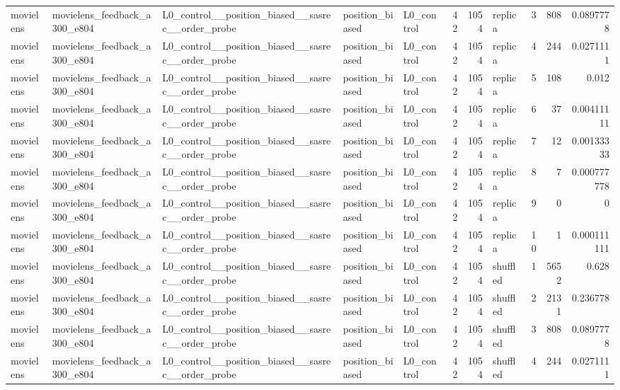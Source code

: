 \begin{table}[htbp!]
\begin{tabular}{lllllrrlrrr}
movielens & movielens\_feedback\_a300\_e804 & L0\_control\_\_position\_biased\_\_sasrec\_\_order\_probe & position\_biased & L0\_control & 42 & 1054 & replica & 3 & 808 & 0.0897778 \\
movielens & movielens\_feedback\_a300\_e804 & L0\_control\_\_position\_biased\_\_sasrec\_\_order\_probe & position\_biased & L0\_control & 42 & 1054 & replica & 4 & 244 & 0.0271111 \\
movielens & movielens\_feedback\_a300\_e804 & L0\_control\_\_position\_biased\_\_sasrec\_\_order\_probe & position\_biased & L0\_control & 42 & 1054 & replica & 5 & 108 & 0.012 \\
movielens & movielens\_feedback\_a300\_e804 & L0\_control\_\_position\_biased\_\_sasrec\_\_order\_probe & position\_biased & L0\_control & 42 & 1054 & replica & 6 & 37 & 0.00411111 \\
movielens & movielens\_feedback\_a300\_e804 & L0\_control\_\_position\_biased\_\_sasrec\_\_order\_probe & position\_biased & L0\_control & 42 & 1054 & replica & 7 & 12 & 0.00133333 \\
movielens & movielens\_feedback\_a300\_e804 & L0\_control\_\_position\_biased\_\_sasrec\_\_order\_probe & position\_biased & L0\_control & 42 & 1054 & replica & 8 & 7 & 0.000777778 \\
movielens & movielens\_feedback\_a300\_e804 & L0\_control\_\_position\_biased\_\_sasrec\_\_order\_probe & position\_biased & L0\_control & 42 & 1054 & replica & 9 & 0 & 0 \\
movielens & movielens\_feedback\_a300\_e804 & L0\_control\_\_position\_biased\_\_sasrec\_\_order\_probe & position\_biased & L0\_control & 42 & 1054 & replica & 10 & 1 & 0.000111111 \\
movielens & movielens\_feedback\_a300\_e804 & L0\_control\_\_position\_biased\_\_sasrec\_\_order\_probe & position\_biased & L0\_control & 42 & 1054 & shuffled & 1 & 5652 & 0.628 \\
movielens & movielens\_feedback\_a300\_e804 & L0\_control\_\_position\_biased\_\_sasrec\_\_order\_probe & position\_biased & L0\_control & 42 & 1054 & shuffled & 2 & 2131 & 0.236778 \\
movielens & movielens\_feedback\_a300\_e804 & L0\_control\_\_position\_biased\_\_sasrec\_\_order\_probe & position\_biased & L0\_control & 42 & 1054 & shuffled & 3 & 808 & 0.0897778 \\
movielens & movielens\_feedback\_a300\_e804 & L0\_control\_\_position\_biased\_\_sasrec\_\_order\_probe & position\_biased & L0\_control & 42 & 1054 & shuffled & 4 & 244 & 0.0271111 \\

\end{tabular}
\end{table}
